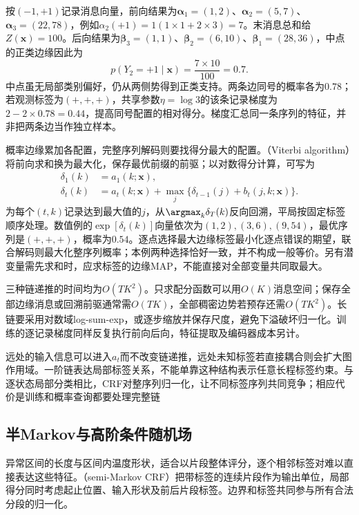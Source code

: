按$(-1,+1)$记录消息向量，前向结果为$\bm{\alpha}_1=(1,2)$、$\bm{\alpha}_2=(5,7)$、$\bm{\alpha}_3=(22,78)$，例如$\alpha_2(+1)=1(1\times1+2\times3)=7$。末消息总和给$Z(\bm{x})=100$。后向结果为$\bm{\beta}_3=(1,1)$、$\bm{\beta}_2=(6,10)$、$\bm{\beta}_1=(28,36)$，中点的正类边缘因此为
\[
  p(Y_2=+1\mid\bm{x})=\frac{7\times10}{100}=0.7.
\]
中点虽无局部类别偏好，仍从两侧势得到正类支持。两条边同号的概率各为$0.78$；若观测标签为$(+,+,+)$，共享参数$\eta=\log3$的该条记录梯度为$2-2\times0.78=0.44$，提高同号配置的相对得分。梯度汇总同一条序列的特征，并非把两条边当作独立样本。

概率边缘累加各配置，完整序列解码则要找得分最大的配置。（Viterbi algorithm）将前向求和换为最大化，保存最优前缀的前驱；以对数得分计算，可写为
\begin{equation}
  \begin{aligned}
    \delta_1(k)&=a_1(k;\bm{x}),\\
    \delta_t(k)&=a_t(k;\bm{x})
       +\max_j\{\delta_{t-1}(j)+b_t(j,k;\bm{x})\}.
  \end{aligned}
  \label{eq:pgm-energy-models-viterbi}
\end{equation}
为每个$(t,k)$记录达到最大值的$j$，从$\argmax_k\delta_T(k)$反向回溯，平局按固定标签顺序处理。数值例的$\exp[\delta_t(k)]$向量依次为$(1,2),(3,6),(9,54)$，最优序列是$(+,+,+)$，概率为$0.54$。逐点选择最大边缘标签最小化逐点错误的期望，联合解码则最大化整序列概率；本例两种选择恰好一致，并不构成一般等价。另有潜变量需先求和时，应求标签的边缘MAP，不能直接对全部变量共同取最大。

三种链递推的时间均为$O(TK^2)$。只求配分函数可以用$O(K)$消息空间；保存全部边缘消息或回溯前驱通常需$O(TK)$，全部稠密边势若预存还需$O(TK^2)$。长链要采用对数域log-sum-exp，或逐步缩放并保存尺度，避免下溢破坏归一化。训练的逐记录梯度同样反复执行前向后向，特征提取及编码器成本另计。

远处的输入信息可以进入$a_t$而不改变链递推，远处未知标签若直接耦合则会扩大图作用域。一阶链表达局部标签关系，不能单靠这种结构表示任意长程标签约束。与逐状态局部分类相比，CRF对整序列归一化，让不同标签序列共同竞争；相应代价是训练和概率查询都要处理完整链

\subsection{半Markov与高阶条件随机场}
\label{sec:pgm-energy-models-semi-higher}

异常区间的长度与区间内温度形状，适合以片段整体评分，逐个相邻标签对难以直接表达这些特征。（semi-Markov CRF）把带标签的连续片段作为输出单位，局部得分同时考虑起止位置、输入形状及前后片段标签。边界和标签共同参与所有合法分段的归一化。

